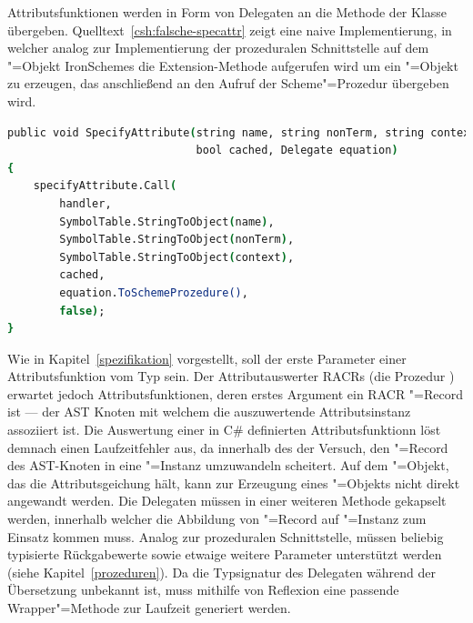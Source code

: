 Attributsfunktionen werden in Form von Delegaten an die Methode  der Klasse  übergeben. Quelltext~\ref{csh:falsche-specattr} zeigt eine naive Implementierung, in welcher analog zur Implementierung der prozeduralen Schnittstelle auf dem "=Objekt IronSchemes die Extension-Methode  aufgerufen wird um ein "=Objekt zu erzeugen, das anschließend an den Aufruf der Scheme"=Prozedur  übergeben wird.

\begin{lstlisting}[language=csh, caption={Naive Implementierung von \csh{SpecifyAttribute}}, label=csh:falsche-specattr]
public void SpecifyAttribute(string name, string nonTerm, string context,
							 bool cached, Delegate equation)
{
	specifyAttribute.Call(
		handler,
		SymbolTable.StringToObject(name),
		SymbolTable.StringToObject(nonTerm),
		SymbolTable.StringToObject(context),
		cached,
		equation.ToSchemeProzedure(),
		false);
}
\end{lstlisting}

Wie in Kapitel~\ref{spezifikation} vorgestellt, soll der erste Parameter einer Attributsfunktion vom Typ  sein. Der Attributauswerter RACRs (die Prozedur ) erwartet jedoch Attributsfunktionen, deren erstes Argument ein RACR "=Record ist — der AST Knoten mit welchem die auszuwertende Attributsinstanz assoziiert ist. Die Auswertung einer in C\# definierten Attributsfunktionn löst demnach einen Laufzeitfehler aus, da innerhalb des  der Versuch, den "=Record des AST-Knoten in eine "=Instanz umzuwandeln scheitert. Auf dem "=Objekt, das die Attributsgeichung hält, kann  zur Erzeugung eines "=Objekts nicht direkt angewandt werden. Die Delegaten müssen in einer weiteren Methode gekapselt werden, innerhalb welcher die Abbildung von "=Record auf "=Instanz zum Einsatz kommen muss. Analog zur prozeduralen Schnittstelle, müssen beliebig typisierte Rückgabewerte sowie etwaige weitere Parameter unterstützt werden (siehe Kapitel~\ref{prozeduren}). Da die Typsignatur des Delegaten während der Übersetzung unbekannt ist, muss mithilfe von Reflexion eine passende Wrapper"=Methode zur Laufzeit generiert werden.

